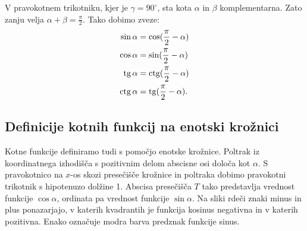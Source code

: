 V pravokotnem trikotniku, kjer je $\gamma={90}^{\circ}$, sta kota $\alpha$ in $\beta$ komplementarna. Zato zanju velja $\alpha+\beta= \frac{\pi}{2}$. Tako dobimo zveze:
\begin{align*}
\sin\alpha &= \cos(\frac{\pi}{2}- \alpha) \\
\cos\alpha &= \sin(\frac{\pi}{2}- \alpha) \\
\operatorname{tg} \alpha &= \operatorname{ctg}(\frac{\pi}{2}- \alpha) \\
\operatorname{ctg}\alpha &= \operatorname{tg}(\frac{\pi}{2}- \alpha).
\end{align*}

\subsection{Definicije kotnih funkcij na enotski krožnici}

Kotne funkcije definiramo tudi s pomočjo enotske krožnice. Poltrak iz koordinatnega izhodišča s pozitivnim delom abscisne osi določa kot $\alpha$. S pravokotnico na $x$-os skozi presečišče krožnice in poltraka dobimo pravokotni trikotnik s hipotenuzo dolžine 1. Abscisa presečišča $T$ tako predstavlja vrednost funkcije $\cos\alpha$, ordinata pa vrednost funkcije $\sin\alpha$. Na sliki rdeči znaki minus in plus ponazarjajo, v katerih kvadrantih je funkcija kosinus negativna in v katerih pozitivna. Enako označuje modra barva predznak funkcije sinus.

\


